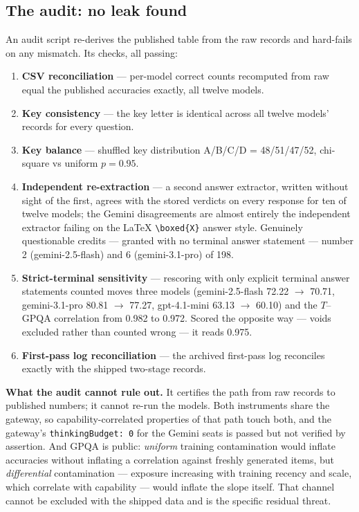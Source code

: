 \documentclass{article}
\providecommand{\tightlist}{\setlength{\itemsep}{0pt}\setlength{\parskip}{0pt}}
\begin{document}
\subsection{The audit: no leak found}\label{the-audit-no-leak-found}

An audit script re-derives the published table from the raw records and hard-fails on any mismatch. Its checks, all passing:

\begin{enumerate}
\def\labelenumi{\arabic{enumi}.}
\tightlist
\item
  \textbf{CSV reconciliation} --- per-model correct counts recomputed from raw equal the published accuracies exactly, all twelve models.
\item
  \textbf{Key consistency} --- the key letter is identical across all twelve models' records for every question.
\item
  \textbf{Key balance} --- shuffled key distribution A/B/C/D = 48/51/47/52, chi-square vs uniform \(p = 0.95\).
\item
  \textbf{Independent re-extraction} --- a second answer extractor, written without sight of the first, agrees with the stored verdicts on every response for ten of twelve models; the Gemini disagreements are almost entirely the independent extractor failing on the LaTeX \texttt{\textbackslash{}boxed\{X\}} answer style. Genuinely questionable credits --- granted with no terminal answer statement --- number 2 (gemini-2.5-flash) and 6 (gemini-3.1-pro) of 198.
\item
  \textbf{Strict-terminal sensitivity} --- rescoring with only explicit terminal answer statements counted moves three models (gemini-2.5-flash 72.22 \ensuremath{\rightarrow} 70.71, gemini-3.1-pro 80.81 \ensuremath{\rightarrow} 77.27, gpt-4.1-mini 63.13 \ensuremath{\rightarrow} 60.10) and the \(T\)--GPQA correlation from 0.982 to 0.972. Scored the opposite way --- voids excluded rather than counted wrong --- it reads 0.975.
\item
  \textbf{First-pass log reconciliation} --- the archived first-pass log reconciles exactly with the shipped two-stage records.
\end{enumerate}

\textbf{What the audit cannot rule out.} It certifies the path from raw records to published numbers; it cannot re-run the models. Both instruments share the gateway, so capability-correlated properties of that path touch both, and the gateway's \texttt{thinkingBudget:\ 0} for the Gemini seats is passed but not verified by assertion. And GPQA is public: \emph{uniform} training contamination would inflate accuracies without inflating a correlation against freshly generated items, but \emph{differential} contamination --- exposure increasing with training recency and scale, which correlate with capability --- would inflate the slope itself. That channel cannot be excluded with the shipped data and is the specific residual threat.
\end{document}
